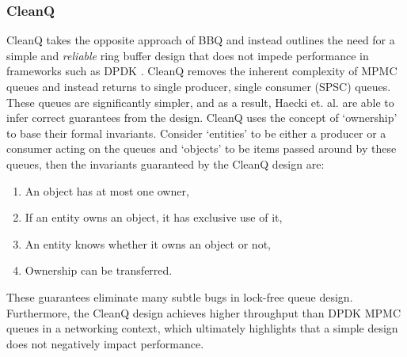 \subsubsection{CleanQ}
CleanQ takes the opposite approach of BBQ and instead outlines the need for a simple and \emph{reliable} ring buffer
design that does not impede performance in frameworks such as DPDK \cite{Haecki_HACSR_19}. CleanQ removes
the inherent complexity of MPMC queues and instead returns to single producer, single consumer (SPSC)
queues. These queues are significantly simpler, and as a result, Haecki et. al. are able to infer
correct guarantees from the design. CleanQ uses the concept of `ownership' to base their formal invariants. 
Consider `entities' to be either a producer or a consumer acting on the queues and `objects' to be items passed around
by these queues, then the invariants guaranteed by the CleanQ design are:
\begin{enumerate}
\item An object has at most one owner,
\item If an entity owns an object, it has exclusive use of it,
\item An entity knows whether it owns an object or not,
\item Ownership can be transferred.
\end{enumerate}
These guarantees eliminate many subtle bugs in lock-free queue design.
Furthermore, the CleanQ design achieves higher throughput than DPDK MPMC queues in a networking
context, which ultimately highlights that a simple design does not negatively impact performance.

